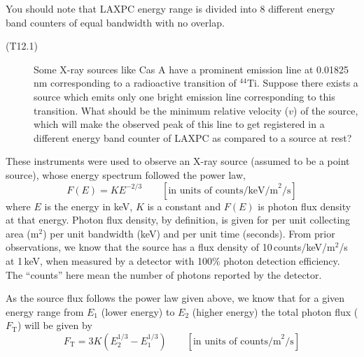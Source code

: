 You should note that LAXPC energy range is divided into 8 different energy band
counters of equal bandwidth with no overlap.

\begin{description}
\item[(T12.1)] Some X-ray sources like Cas A have a prominent emission line at
  0.01825\,nm corresponding to a radioactive transition of $^{44}$Ti. Suppose
  there exists a source which emits only one bright emission line corresponding
  to this transition. What should be the minimum relative velocity ($v$) of the
  source, which will make the observed peak of this line to get registered in a
  different energy band counter of LAXPC as compared to a source at rest?
\end{description}

These instruments were used to observe an X-ray source (assumed to be a point
source), whose energy spectrum followed the power law,
\[ F(E) = K E^{-2/3} \qquad
   [\text{in units of counts/keV/m}^2\text{/s}] \]
where $E$ is the energy in keV, $K$ is a constant and $F(E)$ is photon flux
density at that energy. Photon flux density, by definition, is given for per
unit collecting area (m$^2$) per unit bandwidth (keV) and per unit time
(seconds). From prior observations, we know that the source has a flux density
of 10\,counts/keV/m$^2$/s at 1\,keV, when measured by a detector with 100\%
photon detection efficiency. The ``counts'' here mean the number of photons
reported by the detector.

As the source flux follows the power law given above, we know that for a given
energy range from $E_1$ (lower energy) to $E_2$ (higher energy) the total
photon flux ($F_{\mathrm{T}}$) will be given by
\[ F_{\mathrm{T}} = 3K\left(E_2^{1/3} - E_1^{1/3}\right) \qquad
   [\text{in units of counts/m}^2\text{/s}] \]

